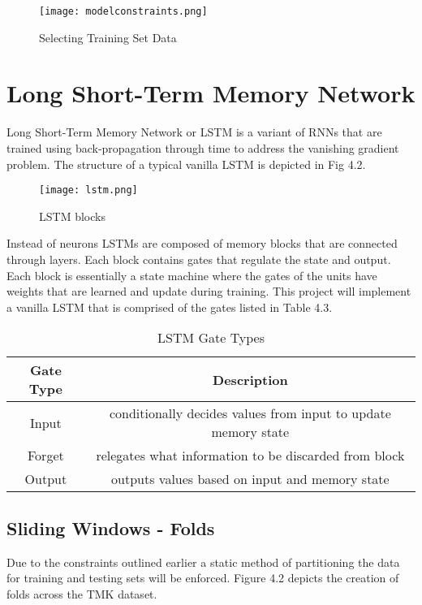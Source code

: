 \begin{figure}[h]
\centering
\texttt{[image: modelconstraints.png]}
\caption{Selecting Training Set Data}
\end{figure}

\section{Long Short-Term Memory Network}
Long Short-Term Memory Network or LSTM is a variant of RNNs that are trained using back-propagation through time to address the vanishing gradient problem. The structure of a typical vanilla LSTM is depicted in Fig 4.2.

\begin{figure}[h]
\centering
\texttt{[image: lstm.png]}
\caption{LSTM blocks}
\end{figure}

Instead of neurons LSTMs are composed of memory blocks that are connected through layers. Each block contains gates that regulate the state and output. Each block is essentially a state machine where the gates of the units have weights that are learned and update during training. This project will implement a vanilla LSTM that is comprised of the gates listed in Table 4.3.

\begin{center}
\begin{table}
\centering
\begin{tabular}{ |c|c| } 
\hline
Gate Type & Description  \\
\hline
 Input & conditionally decides values from input to update memory state\\ 
\hline
 Forget & relegates what information to be discarded from block  \\  
\hline
Output & outputs values based on input and memory state \\ 
\hline
\end{tabular}
\caption{LSTM Gate Types}
\end{table}
\end{center}


\subsection{Sliding Windows - Folds}
Due to the constraints outlined earlier a static method of partitioning the data for training and testing sets will be enforced. Figure 4.2 depicts the creation of folds across the TMK dataset. 

